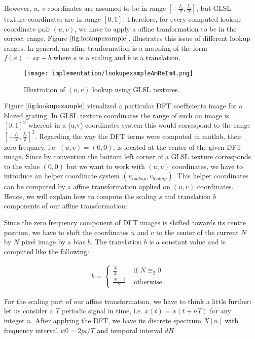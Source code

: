 However, $u$, $v$ coordinates are assumed to be in range $[-\frac{f_s}{2}, \frac{f_s}{2}]$, but GLSL texture coordinates are in range $[0,1]$. Therefore, for every computed lookup coordinate pair $(u,v)$, we have to apply a affine tranformation to be in the correct range. Figure $\ref{fig:lookupexample}$.  illustrates this issue of different lookup ranges. In general, an afine tranformation is a mapping of the form $f(x) = sx + b$ where $s$ is a scaling and $b$ is a translation.

\begin{figure}[H]
  \centering
  \texttt{[image: implementation/lookupexampleAmReIm4.png]}
  \caption[Lookup DFT Coefficients in Textures]{Illustration of $(u,v)$ lookup using GLSL textures.}
\label{fig:lookupexample}
\end{figure}

Figure $\ref{fig:lookupexample}$ visualized a particular DFT coefficients image for a blazed grating. In GLSL texture coordinates the range of such an image is $[0,1]^2$ whereat in a (u,v) coordinates system this would correspond to the range $[-\frac{f_s}{2}, \frac{f_s}{2}]^2$. Regarding the way the DFT terms were computed in matlab, their zero frequncy, i.e. $(u,v) = (0,0)$, is located at the center of the given DFT image. Since by convention the bottom left corner of a GLSL texture corresponds to the value $(0,0)$ but we want to work with $(u,v)$ coordinates, we have to introduce an helper coordinate system $(u_{lookup}, v_{lookup})$. This helper coordinates can be computed by a affine transformation applied on $(u,v)$ coordinates. Hence, we will explain how to compute the scaling $s$ and translation $b$ components of our affine transformation: 

Since the zero frequency component of DFT images is shifted towards its centre position, we have to shift the coordinates $u$ and $v$ to the center of the current $N$ by $N$ pixel image by a bias $b$. The translation $b$ is a constant value and is computed like the following:

\begin{align}
b = \left\{ \begin{array}{rl}
\frac{N}{2} &\mbox{ if $N \equiv_2 0$} \\
\frac{N-1}{2} &\mbox{ otherwise}
\end{array} \right.
\label{eq:bias}
\end{align}

For the scaling part of our affine transformation, we have to think a little further: let us consider a $T$ periodic signal in time, i.e. $x(t) = x(t+nT)$ for any integer $n$. After applying the DFT, we have its discrete spectrum $X[n]$ with frequency interval $w0 = 2pi / T$ and temporal interval $dH$. \\

